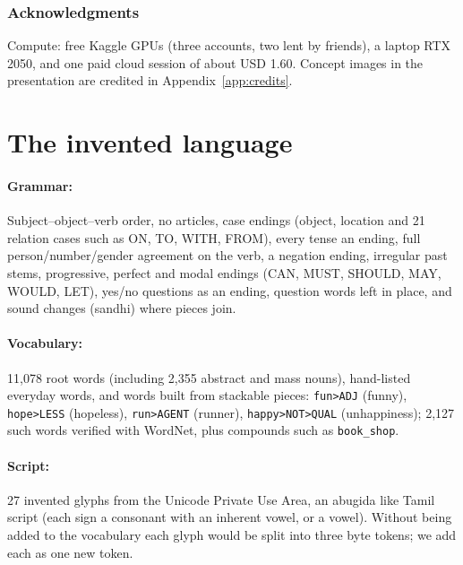 \documentclass{article} %
\newcommand{\an}[1]{\texttt{#1}}
\begin{document}
\subsubsection*{Acknowledgments}
Compute: free Kaggle GPUs (three accounts, two lent by friends), a laptop RTX 2050, and one paid cloud session of
about USD 1.60. Concept images in the presentation are credited in Appendix~\ref{app:credits}.




\newpage
\appendix

\section{The invented language}\label{app:language}

\paragraph{Grammar:} Subject--object--verb order, no articles, case endings (object, location and 21 relation cases
such as ON, TO, WITH, FROM), every tense an ending, full person/number/gender agreement on the verb, a negation
ending, irregular past stems, progressive, perfect and modal endings (CAN, MUST, SHOULD, MAY, WOULD, LET), yes/no
questions as an ending, question words left in place, and sound changes (sandhi) where pieces join.

\paragraph{Vocabulary:} 11,078 root words (including 2,355 abstract and mass nouns), hand-listed everyday words, and
words built from stackable pieces: \an{fun>ADJ} (funny), \an{hope>LESS} (hopeless), \an{run>AGENT} (runner),
\an{happy>NOT>QUAL} (unhappiness); 2,127 such words verified with WordNet, plus compounds such as \an{book\_shop}.

\paragraph{Script:} 27 invented glyphs from the Unicode Private Use Area, an abugida like Tamil script (each sign a
consonant with an inherent vowel, or a vowel). Without being added to the vocabulary each glyph would be split into
three byte tokens; we add each as one new token.
\end{document}
